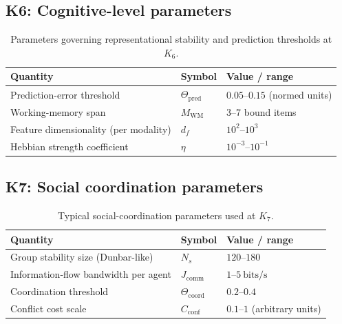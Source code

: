 
\subsection*{K6: Cognitive-level parameters}

\begin{table}[h]
  \centering
  \caption{Parameters governing representational stability and prediction thresholds at \(K_6\).}
  \label{tab:k6-cognitive-parameters}
  \begin{tabular}{lll}
    \hline
    Quantity & Symbol & Value / range \\
    \hline
    Prediction-error threshold & \(\Theta_{\mathrm{pred}}\)
        & \(0.05\text{–}0.15\) (normed units) \\
    Working-memory span & \(M_\mathrm{WM}\)
        & \(3\text{–}7\) bound items \\
    Feature dimensionality (per modality)
        & \(d_f\)
        & \(10^2\text{–}10^3\) \\
    Hebbian strength coefficient & \(\eta\)
        & \(10^{-3}\text{–}10^{-1}\) \\
    \hline
  \end{tabular}
\end{table}


\subsection*{K7: Social coordination parameters}

\begin{table}[h]
  \centering
  \caption{Typical social-coordination parameters used at \(K_7\).}
  \label{tab:k7-social-parameters}
  \begin{tabular}{lll}
    \hline
    Quantity & Symbol & Value / range \\
    \hline
    Group stability size (Dunbar-like) & \(N_s\)
        & \(120\text{–}180\) \\
    Information-flow bandwidth per agent & \(J_\mathrm{comm}\)
        & \(1\text{–}5~\mathrm{bits/s}\) \\
    Coordination threshold & \(\Theta_{\mathrm{coord}}\)
        & \(0.2\text{–}0.4\) \\
    Conflict cost scale & \(C_\mathrm{conf}\)
        & \(0.1\text{–}1\) (arbitrary units) \\
    \hline
  \end{tabular}
\end{table}

